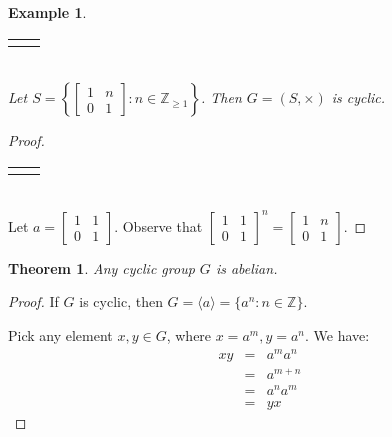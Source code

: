 \documentclass{article}
\theoremstyle{MyNonumberplain}
\theoremstyle{break}
\newtheorem*{proof}{Proof. }
\newcommand{\Z}{\mathbb{Z}}
\newcommand{\cyclic}[1]{\langle #1 \rangle}
\newcommand{\nline}{\begin{tabular}{ll}&\\\end{tabular}}
\theoremstyle{break}
\newtheorem{theorem}{Theorem}[section]
\newtheorem{example}{Example}[section]
\theoremstyle{break}
\theoremstyle{definition}
\theoremstyle{break}
\begin{document}
\begin{expbox}
    \begin{example}
        \nline\\
        Let $S = \left\{ \left[\begin{array}{cc}
            1 & n\\
            0 & 1
          \end{array}\right] : n \in \mathbb{Z}_{\geqslant 1} \right\}$. Then $G = (S,
          \times)$ is cyclic.
    \end{example}
    \begin{prfbox}
        \begin{proof}
            \nline\\
            Let $a = \left[\begin{array}{cc}
                1 & 1\\
                0 & 1
              \end{array}\right]$. Observe that $\left[\begin{array}{cc}
                1 & 1\\
                0 & 1
              \end{array}\right]^n = \left[\begin{array}{cc}
                1 & n\\
                0 & 1
              \end{array}\right]$.
        \end{proof}
    \end{prfbox}
\end{expbox}




\newpage

\begin{thmbox}
    \begin{theorem}
        Any cyclic group $G$ is abelian.
    \end{theorem}
    \begin{prfbox}
        \begin{proof}
            If $G$ is cyclic, then $G=\cyclic{a}=\{a^n:n\in\Z\}$.\bigskip

            Pick any element $x,y\in G$, where $x=a^m,y=a^n$. We have:
            \begin{eqnarray*}
                xy & = & a^ma^n\\
                   & = & a^{m+n}\\
                   & = & a^na^m\\
                   & = & yx
            \end{eqnarray*}
        \end{proof}
    \end{prfbox}    
\end{thmbox}
\end{document}
